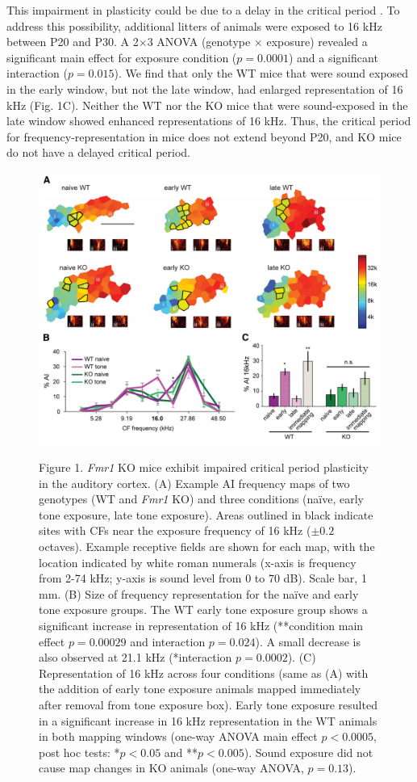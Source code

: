 This impairment in plasticity could be due to a delay in the critical period \cite{Harlow2010a}. To address this possibility, additional litters of animals were exposed to 16 kHz between P20 and P30. A 2$\times$3 ANOVA (genotype $\times$ exposure) revealed a significant main effect for exposure condition ($p=0.0001$) and a significant interaction ($p=0.015$). We find that only the WT mice that were sound exposed in the early window, but not the late window, had enlarged representation of 16 kHz (Fig. 1C). Neither the WT nor the KO mice that were sound-exposed in the late window showed enhanced representations of 16 kHz. Thus, the critical period for frequency-representation in mice does not extend beyond P20, and KO mice do not have a delayed critical period.

\begin{figure}[p]
	\centering
		\includegraphics[width=6in]{images/C2F1}
	\begin{changemargin}{1in}{1in}
	\footnotesize{Figure 1. \textit{Fmr1} KO mice exhibit impaired critical period plasticity in the auditory cortex. (A) Example AI frequency maps of two genotypes (WT and \textit{Fmr1} KO) and three conditions (na\"ive, early tone exposure, late tone exposure). Areas outlined in black indicate sites with CFs near the exposure frequency of 16 kHz ($\pm0.2$ octaves). Example receptive fields are shown for each map, with the location indicated by white roman numerals (x-axis is frequency from 2-74 kHz; y-axis is sound level from 0 to 70 dB). Scale bar, 1 mm. (B) Size of frequency representation for the na\"ive and early tone exposure groups. The WT early tone exposure group shows a significant increase in representation of 16 kHz (**condition main effect $p=0.00029$ and interaction $p=0.024$). A small decrease is also observed at 21.1 kHz (*interaction $p=0.0002$). (C) Representation of 16 kHz across four conditions (same as (A) with the addition of early tone exposure animals mapped immediately after removal from tone exposure box). Early tone exposure resulted in a significant increase in 16 kHz representation in the WT animals in both mapping windows (one-way ANOVA main effect $p<0.0005$, post hoc tests: *$p<0.05$ and **$p<0.005$). Sound exposure did not cause map changes in KO animals (one-way ANOVA, $p=0.13$).}

\end{changemargin}
\end{figure}
